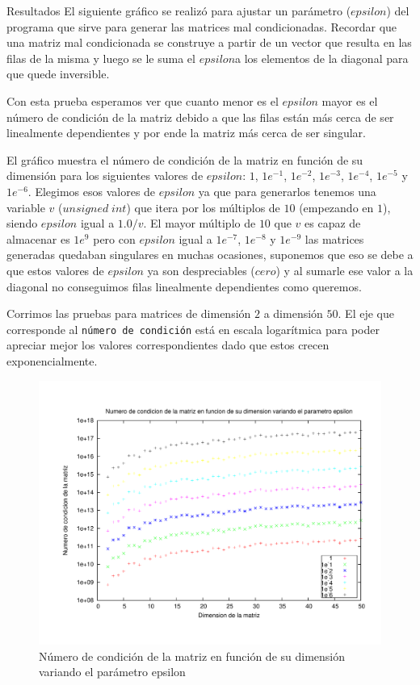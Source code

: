 \begin{section}{Resultados}
	El siguiente gráfico se realizó para ajustar un parámetro ($epsilon$) del programa que sirve para generar las matrices mal condicionadas. Recordar que una matriz mal condicionada se construye a partir de un vector que resulta en las filas de la misma y luego se le suma el $epsilon$a los elementos de la diagonal para que quede inversible.
	
	Con esta prueba esperamos ver que cuanto menor es el $epsilon$ mayor es el número de condición de la matriz debido a que las filas están más cerca de ser linealmente dependientes y por ende la matriz más cerca de ser singular.

	El gráfico muestra el número de condición de la matriz en función de su dimensión para los siguientes valores de $epsilon$: $1$, $1e^{-1}$, $1e^{-2}$, $1e^{-3}$, $1e^{-4}$, $1e^{-5}$ y $1e^{-6}$. Elegimos esos valores de $epsilon$ ya que para generarlos tenemos una variable $v$ ($unsigned\;int$) que itera por los múltiplos de $10$ (empezando en $1$), siendo $epsilon$ igual a $1.0/v$. El mayor múltiplo de $10$ que $v$ es capaz de almacenar es $1e^9$ pero con $epsilon$ igual a $1e^{-7}$, $1e^{-8}$ y $1e^{-9}$ las matrices generadas quedaban singulares en muchas ocasiones, suponemos que eso se debe a que estos valores de $epsilon$ ya son despreciables ($cero$) y al sumarle ese valor a la diagonal no conseguimos filas linealmente dependientes como queremos.
	
	Corrimos las pruebas para matrices de dimensión $2$ a dimensión $50$.
	El eje que corresponde al \texttt{número de condición} está en escala logarítmica para poder apreciar mejor los valores correspondientes dado que estos crecen exponencialmente.

	\begin{figure}[H]
	  \centering
		\includegraphics[width=14cm]{graficos/ajuste_epsilon.pdf}
	  \caption{Número de condición de la matriz en función de su dimensión variando el parámetro epsilon}
	  \label{fig:epsilon}
	\end{figure}
	

\end{section}
